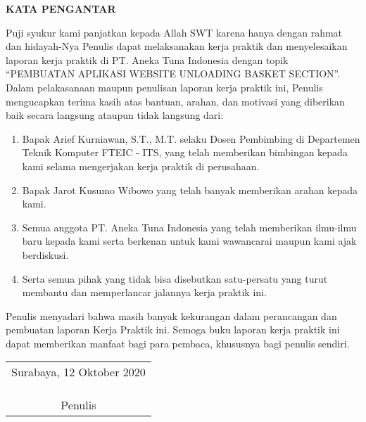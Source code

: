 \begin{center}
  \Large\textbf{KATA PENGANTAR}
\end{center}
\vspace{2ex}


\setlength{\parindent}{7ex}


Puji syukur kami panjatkan kepada Allah SWT karena hanya dengan rahmat dan hidayah-Nya Penulis dapat melaksanakan kerja praktik dan menyelesaikan laporan kerja praktik di PT. Aneka Tuna Indonesia dengan topik “PEMBUATAN APLIKASI WEBSITE UNLOADING BASKET SECTION”.
Dalam pelakasanaan maupun penulisan laporan kerja praktik ini, Penulis mengucapkan terima kasih atas bantuan, arahan, dan motivasi yang diberikan baik secara langsung ataupun tidak langsung dari:
\vspace{0.5ex}

\begin{enumerate}[nolistsep]

  \item Bapak Arief Kurniawan, S.T., M.T. selaku Dosen Pembimbing di Departemen Teknik Komputer FTEIC - ITS, yang telah memberikan bimbingan kepada kami selama mengerjakan kerja praktik di perusahaan.
  \vspace{0.5ex}

  \item Bapak Jarot Kusumo Wibowo yang telah banyak memberikan arahan kepada kami.
  \vspace{0.5ex}

  \item Semua anggota PT. Aneka Tuna Indonesia yang telah memberikan ilmu-ilmu baru kepada kami serta berkenan untuk kami wawancarai maupun kami ajak berdiskusi.
  \vspace{0.5ex}

  \item Serta semua pihak yang tidak bisa disebutkan satu-persatu yang turut membantu dan memperlancar jalannya kerja praktik ini.
  \vspace{0.5ex}

\end{enumerate}
\vspace{0.5ex}

Penulis menyadari bahwa masih banyak kekurangan dalam perancangan dan pembuatan laporan Kerja Praktik ini.
Semoga buku laporan kerja praktik ini dapat memberikan manfaat bagi para pembaca, khususnya bagi penulis sendiri.
\vspace{2ex}

\begin{flushright}
  \begin{tabular}[b]{c}
    Surabaya, 12 Oktober 2020
    \\
    \\
    \\
    \\
    Penulis
  \end{tabular}
\end{flushright}
